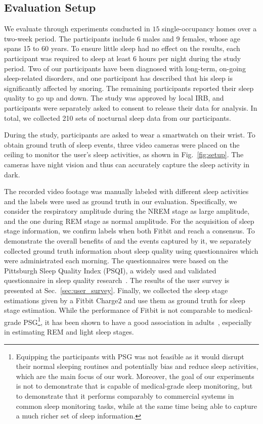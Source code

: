 \subsection{Evaluation Setup\label{sec:evalusers}}

 We evaluate {\systemname} through experiments conducted in $15$ single-occupancy homes over a two-week period.
The participants include 6 males and 9 females, whose age spans 15 to 60 years. To ensure little sleep had no effect on the results, each
participant was required to sleep at least $6$ hours per night during the study period. Two of our participants have been diagnosed with
long-term, on-going sleep-related disorders, and one participant has described that his sleep is significantly affected by snoring. The
remaining participants reported their sleep quality to go up and down. The study was approved by local IRB, and participants were
separately asked to consent to release their data for analysis. In total, we collected 210 sets of nocturnal sleep data from our
participants.

 During the study, participants are asked to wear a smartwatch on their wrist. To obtain ground truth of sleep events,
three video cameras were placed on the ceiling to monitor the user's sleep activities, as shown in Fig.~\ref{fig:setup}. The cameras have
night vision and thus can accurately capture the sleep activity in dark.


 The recorded video footage was manually labeled with different sleep activities and the labels
were used as ground truth in our evaluation. Specifically, we consider the respiratory amplitude during the NREM stage as large amplitude,
and the one during REM stage as normal amplitude. For the acquisition of sleep stage information, we confirm labels when both Fitbit and
{\systemname} reach a consensus. To demonstrate the overall benefits of {\systemname} and the events captured by it, we separately
collected ground truth information about sleep quality using questionnaires which were administrated each morning. The questionnaires were
based on the Pittsburgh Sleep Quality Index (PSQI), a widely used and validated questionnaire in sleep quality
research~\cite{buysse1989pittsburgh}. The results of the user survey is presented at Sec.~\ref{sec:user_survey}. Finally, we collected the
sleep stage estimations given by a Fitbit Charge2 and use them as ground truth for sleep stage estimation. While the performance of Fitbit
is not comparable to medical-grade PSG\footnote{Equipping the participants with PSG was not feasible as it would disrupt their normal
sleeping routines and potentially bias and reduce sleep activities, which are the main focus of our work. Moreover, the goal of our
experiments is not to demonstrate that {\systemname} is capable of medical-grade sleep monitoring, but to demonstrate that it performs
comparably to commercial systems in common sleep monitoring tasks, while at the same time being able to capture a much richer set of sleep
information.}, it has been shown to have a good association in adults~\cite{evenson2015systematic,fitbit01,fitbit02,fitbit03}, especially
in estimating REM and light sleep stages.


